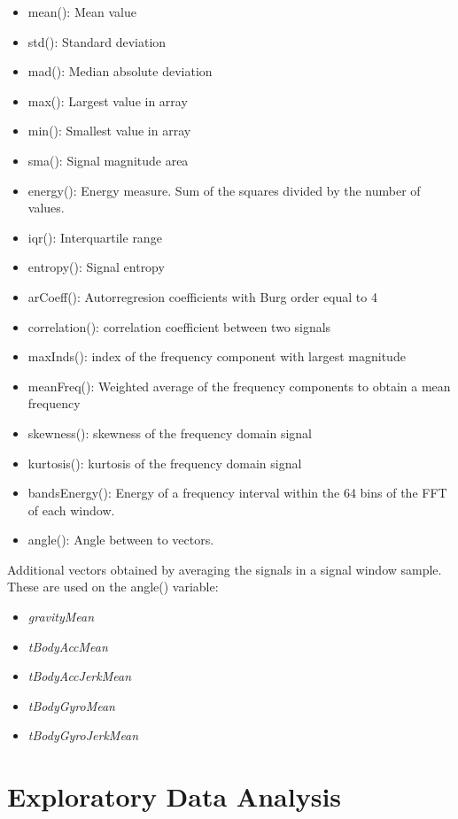 \documentclass[
]{article}
\begin{document}
\begin{itemize}
\item
  mean(): Mean value
\item
  std(): Standard deviation
\item
  mad(): Median absolute deviation
\item
  max(): Largest value in array
\item
  min(): Smallest value in array
\item
  sma(): Signal magnitude area
\item
  energy(): Energy measure. Sum of the squares divided by the number of
  values.
\item
  iqr(): Interquartile range
\item
  entropy(): Signal entropy
\item
  arCoeff(): Autorregresion coefficients with Burg order equal to 4
\item
  correlation(): correlation coefficient between two signals
\item
  maxInds(): index of the frequency component with largest magnitude
\item
  meanFreq(): Weighted average of the frequency components to obtain a
  mean frequency
\item
  skewness(): skewness of the frequency domain signal
\item
  kurtosis(): kurtosis of the frequency domain signal
\item
  bandsEnergy(): Energy of a frequency interval within the 64 bins of
  the FFT of each window.
\item
  angle(): Angle between to vectors.
\end{itemize}

Additional vectors obtained by averaging the signals in a signal window
sample. These are used on the angle() variable:

\begin{itemize}
\item
  \emph{gravityMean}
\item
  \emph{tBodyAccMean}
\item
  \emph{tBodyAccJerkMean}
\item
  \emph{tBodyGyroMean}
\item
  \emph{tBodyGyroJerkMean}
\end{itemize}

\hypertarget{exploratory-data-analysis}{%
\section{Exploratory Data Analysis}\label{exploratory-data-analysis}}
\end{document}
